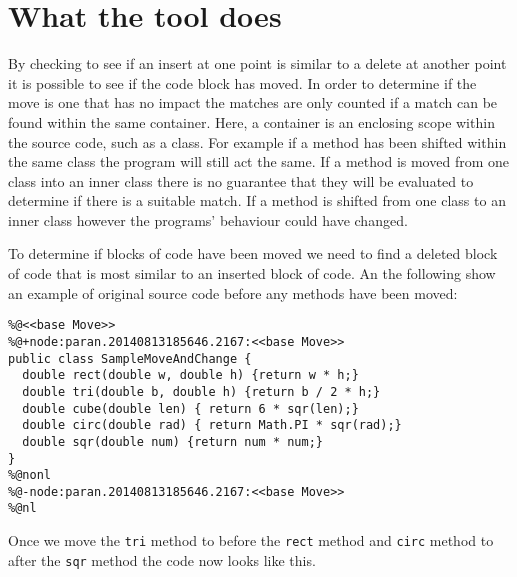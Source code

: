 % 

\section{What the tool does}

By checking to see if an insert at one point is similar to a delete at another point it is possible to see if the code block has moved. In order to determine if the move is one that has no impact the matches are only counted if a match can be found within the same container.  Here, a container is an enclosing scope within the source code, such as a class. For example if a method has been shifted within the same class the program will still act the same.  If a method is moved from one class into an inner class there is no guarantee that they will be evaluated to determine if there is a suitable match.  If a method is shifted from one class to an inner class however the programs' behaviour could have changed.

To determine if blocks of code have been moved we need to find a deleted block of code that is most similar to an inserted block of code.  An the following show an example of original source code before any methods have been moved: 

\begin{lstlisting}
%@<<base Move>>
%@+node:paran.20140813185646.2167:<<base Move>>
public class SampleMoveAndChange {
  double rect(double w, double h) {return w * h;}
  double tri(double b, double h) {return b / 2 * h;}
  double cube(double len) { return 6 * sqr(len);}
  double circ(double rad) { return Math.PI * sqr(rad);}
  double sqr(double num) {return num * num;}
}
%@nonl
%@-node:paran.20140813185646.2167:<<base Move>>
%@nl
\end{lstlisting}

Once we move the \lstinline{tri} method to before the \lstinline{rect} method and \lstinline{circ} method to after the \lstinline{sqr} method the code now looks like this.

